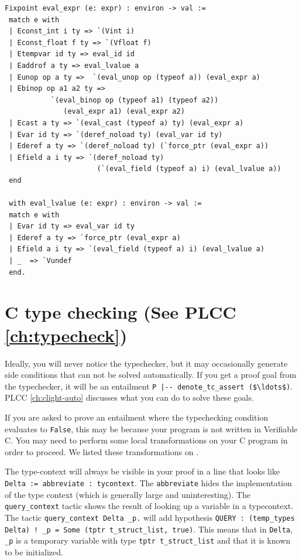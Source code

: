 \documentclass[12pt,fleqn,openany,oneside,showtrims]{memoir}
\newcommand{\ychapter}[2]{\chapter[#1]{#1 \hfill \normalsize #2}}
\begin{document}
\clearpage
\begin{lstlisting}
Fixpoint eval_expr (e: expr) : environ -> val :=
 match e with
 | Econst_int i ty => `(Vint i)
 | Econst_float f ty => `(Vfloat f)
 | Etempvar id ty => eval_id id 
 | Eaddrof a ty => eval_lvalue a 
 | Eunop op a ty =>  `(eval_unop op (typeof a)) (eval_expr a) 
 | Ebinop op a1 a2 ty =>  
           `(eval_binop op (typeof a1) (typeof a2))
              (eval_expr a1) (eval_expr a2)
 | Ecast a ty => `(eval_cast (typeof a) ty) (eval_expr a) 
 | Evar id ty => `(deref_noload ty) (eval_var id ty)
 | Ederef a ty => `(deref_noload ty) (`force_ptr (eval_expr a))
 | Efield a i ty => `(deref_noload ty) 
                      (`(eval_field (typeof a) i) (eval_lvalue a))
 end

 with eval_lvalue (e: expr) : environ -> val := 
 match e with 
 | Evar id ty => eval_var id ty
 | Ederef a ty => `force_ptr (eval_expr a)
 | Efield a i ty => `(eval_field (typeof a) i) (eval_lvalue a)
 | _  => `Vundef
 end.
\end{lstlisting}

\ychapter{C type checking}{(See PLCC \autoref{ch:typecheck})}
Ideally, you will never notice the typechecker, but it may occasionally
generate side conditions that can not be solved automatically.
If you get a proof goal from the typechecker, it will be an entailment 
\lstinline!P |-- denote_tc_assert ($\ldots$)!. PLCC
\autoref{ch:clight-auto} discusses what you can do to solve these goals. 

If you are asked to prove an entailment where the typechecking condition
evaluates to \lstinline|False|, this may be because your program is not written in
Verifiable C. You may need to perform some local transformations on your C
program in order to proceed. We listed these transformations on
. 

The type-context will always be visible in your proof in a line that looks like 
\lstinline|Delta := abbreviate : tycontext|. The \lstinline|abbreviate|
hides the implementation of the type context (which is generally large
and uninteresting). The
\lstinline|query_context| tactic shows the result of looking up a variable in
a typecontext. The tactic \lstinline|query_context Delta _p.| will add hypothesis
\lstinline|QUERY : (temp_types Delta) ! _p = Some (tptr t_struct_list, true)|.
This means that in \lstinline|Delta|, \lstinline|_p| is a temporary variable
with type \lstinline|tptr t_struct_list| and that it is known to be initialized.
\end{document}

